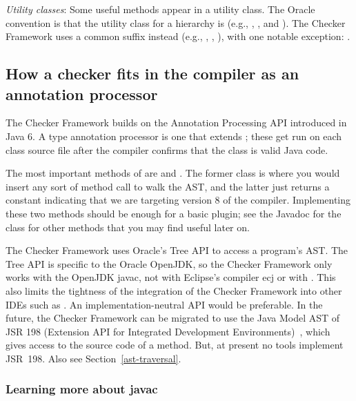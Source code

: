\emph{Utility classes}:
Some useful methods appear in a utility class.  The Oracle convention is that
the utility class for a  hierarchy is  (e.g.,
, , and
).  The Checker Framework uses a common
 suffix instead (e.g., ,
, ), with one
notable exception: .


\subsection{How a checker fits in the compiler as an annotation processor}

The Checker Framework builds on the Annotation Processing API
introduced in Java 6.  A type annotation processor is one that extends
; these get run on each class
source file after the compiler confirms that the class is valid Java code.

The most important methods of 
are  and . The former
class is where you would insert any sort of method call to walk the AST\@,
and the latter just returns a constant indicating that we are targeting
version 8 of the compiler. Implementing these two methods should be enough
for a basic plugin; see the Javadoc for the class for other methods that
you may find useful later on.

The Checker Framework uses Oracle's Tree API to access a program's AST\@.
The Tree API is specific to the Oracle OpenJDK, so the Checker Framework only
works with the OpenJDK javac, not with Eclipse's compiler ecj or with
.  This also limits the tightness of
the integration of the Checker Framework into other IDEs such as \@.
An implementation-neutral API would be preferable.
In the future, the Checker Framework
can be migrated to use the Java Model AST of JSR 198 (Extension API for
Integrated Development Environments)~\cite{JSR198}, which gives access to
the source code of a method.  But, at present no tools
implement JSR~198.  Also see Section~\ref{ast-traversal}.



\subsubsection{Learning more about javac}

